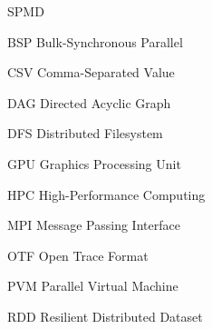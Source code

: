 \begin{listofabbrv}{SPMD}
	\item[BSP] Bulk-Synchronous Parallel
	\item[CSV] Comma-Separated Value
        \item[DAG] Directed Acyclic Graph
        \item[DFS] Distributed Filesystem
        \item[GPU] Graphics Processing Unit
        \item[HPC] High-Performance Computing
        \item[MPI] Message Passing Interface
        \item[OTF] Open Trace Format
        \item[PVM] Parallel Virtual Machine
        \item[RDD] Resilient Distributed Dataset
\end{listofabbrv}


\listoffigures

\listoftables

\tableofcontents